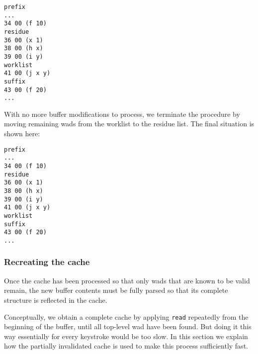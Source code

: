 \begin{verbatim}
prefix
...
34 00 (f 10)
residue
36 00 (x 1)
38 00 (h x)
39 00 (i y)
worklist
41 00 (j x y)
suffix
43 00 (f 20)
...
\end{verbatim}

With no more buffer modifications to process, we terminate the
procedure by moving remaining wads from the worklist to the
residue list.  The final situation is shown here:

\begin{verbatim}
prefix
...
34 00 (f 10)
residue
36 00 (x 1)
38 00 (h x)
39 00 (i y)
41 00 (j x y)
worklist
suffix
43 00 (f 20)
...
\end{verbatim}

\subsubsection{Recreating the cache}

Once the cache has been processed so that only wads that are
known to be valid remain, the new buffer contents must be fully parsed
so that its complete structure is reflected in the cache.

Conceptually, we obtain a complete cache by applying \texttt{read}
repeatedly from the beginning of the buffer, until all top-level wad
have been found.  But doing it this way essentially for every
keystroke would be too slow.  In this section we explain how the
partially invalidated cache is used to make this process sufficiently
fast.
